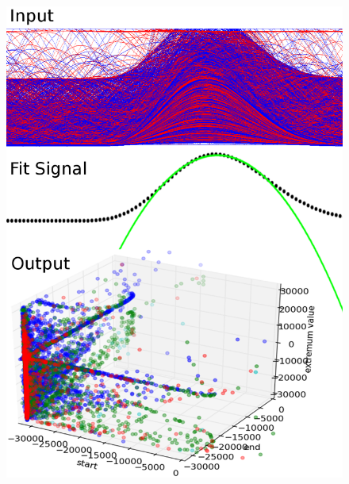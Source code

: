 \documentclass[ddcfooter]{tudbeamer}
\begin{document}
\begin{frame}
\begin{minipage}{0.475\textwidth}
\begin{figure}
        \includegraphics[scale=.11]{TaskDescription.png}
    \end{figure} 
\end{minipage}
\end{frame}

\end{document}
